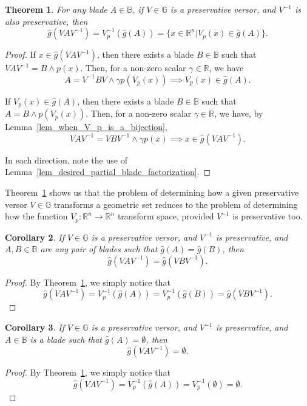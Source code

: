 \documentclass{birkjour}
\newtheorem{thm}{Theorem}[section]
\newtheorem{cor}[thm]{Corollary}
\theoremstyle{definition}
\theoremstyle{remark}
\numberwithin{equation}{section}
\newcommand{\R}{\mathbb{R}}
\newcommand{\B}{\mathbb{B}}
\newcommand{\G}{\mathbb{G}}
\newcommand{\gh}{\hat{g}}
\begin{document}
\begin{thm}\label{thm_how_preservative_versor_transforms}
For any blade $A\in\B$,
if $V\in\G$ is a preservative versor, and $V^{-1}$ is also preservative, then
\begin{equation}
\gh(VAV^{-1}) = V_p^{-1}(\gh(A)) = \{x\in\R^n|V_p(x)\in\gh(A)\}.
\end{equation}
\end{thm}
\begin{proof}
If $x\in\gh(VAV^{-1})$, then there exists a blade $B\in\B$
such that $VAV^{-1}=B\wedge p(x)$.  Then, for a non-zero scalar $\gamma\in\R$,
we have
\begin{equation}
A=V^{-1}BV\wedge\gamma p(V_p(x))\implies V_p(x)\in\gh(A).
\end{equation}

If $V_p(x)\in\gh(A)$, then there exists a blade $B\in\B$
such that $A = B\wedge p(V_p(x))$.  Then, for a non-zero scalar $\gamma\in\R$,
we have, by Lemma~\ref{lem_when_V_p_is_a_bijection},
\begin{equation}
VAV^{-1}=VBV^{-1}\wedge\gamma p(x)\implies x\in\gh(VAV^{-1}).
\end{equation}

In each direction, note the use of Lemma~\ref{lem_desired_partial_blade_factorization}.
\end{proof}

Theorem~\ref{thm_how_preservative_versor_transforms} shows us that the
problem of determining how a given preservative
versor $V\in\G$ transforms a geometric set reduces to the problem of determining
how the function $V_p:\R^n\to\R^n$ transform space, provided $V^{-1}$ is preservative too.

\begin{cor}
If $V\in\G$ is a preservative versor, and $V^{-1}$ is preservative, and $A,B\in\B$ are any pair
of blades such that $\gh(A)=\gh(B)$, then
\begin{equation}
\gh(VAV^{-1})=\gh(VBV^{-1}).
\end{equation}
\end{cor}
\begin{proof}
By Theorem~\ref{thm_how_preservative_versor_transforms}, we simply notice that
\begin{equation}
\gh(VAV^{-1})=V_p^{-1}(\gh(A))=V_p^{-1}(\gh(B))=\gh(VBV^{-1}).
\end{equation}
\end{proof}

\begin{cor}
If $V\in\G$ is a preservative versor, and $V^{-1}$ is preservative,
and $A\in\B$ is a blade such that $\gh(A)=\emptyset$, then
\begin{equation}
\gh(VAV^{-1})=\emptyset.
\end{equation}
\end{cor}
\begin{proof}
By Theorem~\ref{thm_how_preservative_versor_transforms}, we simply notice that
\begin{equation}
\gh(VAV^{-1})=V_p^{-1}(\gh(A))=V_p^{-1}(\emptyset)=\emptyset.
\end{equation}
\end{proof}
\end{document}
